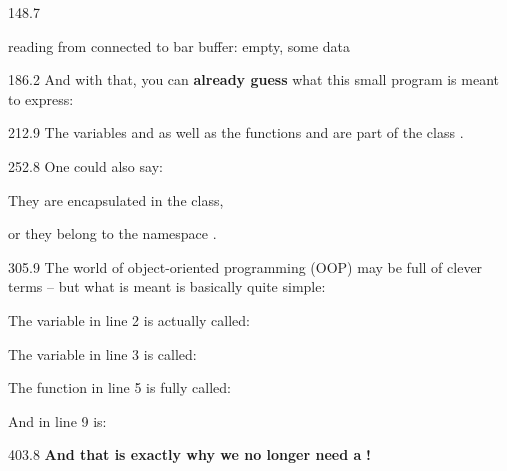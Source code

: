 \documentclass{aslab}
\begin{document}
\begin{region}[x=74.7,right=0,pitch=11]{148.7}
\begin{codeblock}[basicstyle=\fontsize{9bp}{11bp}\ttfamily]
reading from connected to bar
buffer: empty, some data
\end{codeblock}
\end{region}

\begin{region}[x=74.7,right=0]{186.2}
And with that, you can \textbf{already guess} what this small program is
meant to express:
\end{region}

\begin{region}[x=74.7,right=0,pitch=13.5]{212.9}
The variables  and  as well as the functions
 and  are part of the class .
\end{region}

\begin{region}[x=74.7,right=0,pitch=13.75]{252.8}
One could also say:
\begin{dotlist}
\item They are encapsulated in the class,
\item or they belong to the namespace .
\end{dotlist}
\end{region}

\begin{region}[x=74.7,right=0,pitch=13.6]{305.9}
The world of object-oriented programming (OOP) may be full of clever
terms -- but what is meant is basically quite simple:
\begin{dotlist}
\item The variable  in line 2 is actually called:
\item The variable  in line 3 is called: 
\item The function  in line 5 is fully called:
\item And  in line 9 is: 
\end{dotlist}
\end{region}

\begin{region}[x=74.7,right=0]{403.8}
 \textbf{And that is exactly why we no longer need a}
\textbf{!}
\end{region}
\end{document}
